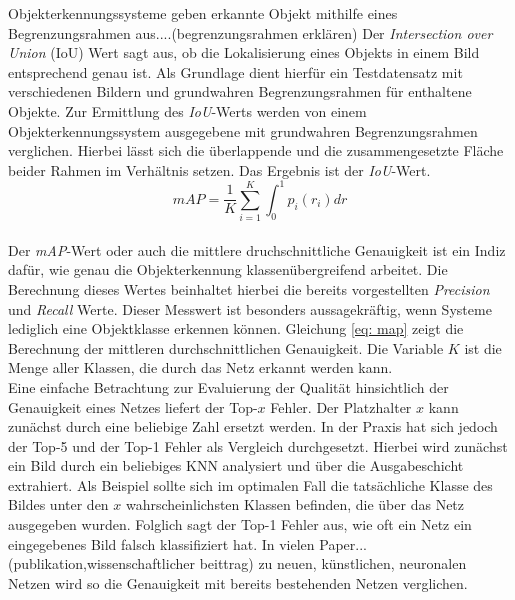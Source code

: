 		Objekterkennungssysteme geben erkannte Objekt mithilfe eines Begrenzungsrahmen aus....(begrenzungsrahmen erklären)  Der \textit{Intersection over Union} (IoU) Wert sagt aus, ob die Lokalisierung eines Objekts in einem Bild entsprechend genau ist. Als Grundlage dient hierfür ein Testdatensatz mit verschiedenen Bildern und grundwahren Begrenzungsrahmen für enthaltene Objekte. Zur Ermittlung des \textit{IoU}-Werts werden von einem Objekterkennungssystem ausgegebene mit grundwahren Begrenzungsrahmen verglichen. Hierbei lässt sich die überlappende und die zusammengesetzte Fläche beider Rahmen im Verhältnis setzen. Das Ergebnis ist der \textit{IoU}-Wert.    \\
		
		\begin{equation}
		mAP = \frac{1}{K}\sum_{i=1}^{K}\int_{0}^{1}p_i(r_i)dr
		\label{eq: map}
		\end{equation}\\
		
		Der \textit{mAP}-Wert oder auch die mittlere druchschnittliche Genauigkeit ist ein Indiz dafür, wie genau die Objekterkennung klassenübergreifend arbeitet. Die Berechnung dieses Wertes beinhaltet hierbei die bereits vorgestellten \textit{Precision} und \textit{Recall} Werte. Dieser Messwert ist besonders aussagekräftig, wenn Systeme lediglich eine Objektklasse erkennen können. Gleichung \ref{eq: map} zeigt die Berechnung der mittleren durchschnittlichen Genauigkeit. Die Variable $K$ ist die Menge aller Klassen, die durch das Netz erkannt werden kann.  \\
		
		Eine einfache Betrachtung zur Evaluierung der Qualität hinsichtlich der Genauigkeit eines Netzes liefert der Top-$x$ Fehler. Der Platzhalter $x$ kann zunächst durch eine beliebige Zahl ersetzt werden. In der Praxis hat sich jedoch der Top-5 und der Top-1 Fehler als Vergleich durchgesetzt. Hierbei wird zunächst ein Bild durch ein beliebiges KNN analysiert und über die Ausgabeschicht extrahiert. Als Beispiel sollte sich im optimalen Fall die tatsächliche Klasse des Bildes unter den $x$ wahrscheinlichsten Klassen befinden, die über das Netz ausgegeben wurden. Folglich sagt der Top-1 Fehler aus, wie oft ein Netz ein eingegebenes Bild falsch klassifiziert hat. In vielen Paper...(publikation,wissenschaftlicher beittrag) zu neuen, künstlichen, neuronalen Netzen wird so die Genauigkeit mit bereits bestehenden Netzen verglichen.
		
		
		
		
		
